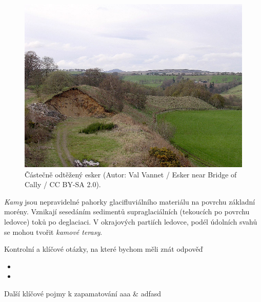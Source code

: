 \begin{figure}
	\centering
	\includegraphics[width=1\linewidth]{obrazky/glac/esker}
	\caption{Částečně odtěžený esker (Autor: Val Vannet / Esker near Bridge of Cally / CC BY-SA 2.0).}
	\label{fig:esker}
\end{figure}

\emph{Kamy} jsou nepravidelné pahorky glacifluviálního materiálu na povrchu základní morény. Vznikají sesedáním sedimentů supraglaciálních (tekoucích po povrchu ledovce) toků po deglaciaci. V okrajových partiích ledovce, podél údolních svahů se mohou tvořit \emph{kamové terasy}.

\newpage
\onecolumn
\begin{boxotazky}{Kontrolní a klíčové otázky, na které bychom měli znát odpověď}
	\begin{itemize}
		\item 
		\item 
		
	\end{itemize}
\end{boxotazky}

\begin{boxslovnik}{Další klíčové pojmy k zapamatování}
	aaa & adfasd \\
	
\end{boxslovnik}
\twocolumn